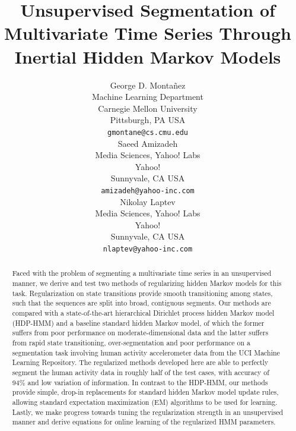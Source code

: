\documentclass[12pt]{article}
\begin{document}
\title{Unsupervised Segmentation of Multivariate Time Series Through Inertial Hidden Markov Models}

\author{
George D. Monta\~nez \\
Machine Learning Department\\
Carnegie Mellon University\\
Pittsburgh, PA USA\\
\texttt{gmontane@cs.cmu.edu} \\
\And    
Saeed Amizadeh\\
Media Sciences, Yahoo! Labs\\
Yahoo!\\
Sunnyvale, CA USA\\
\texttt{amizadeh@yahoo-inc.com} \\
\And
Nikolay Laptev \\
Media Sciences, Yahoo! Labs\\
Yahoo!\\
Sunnyvale, CA USA\\
\texttt{nlaptev@yahoo-inc.com} \\
}

\maketitle

\begin{abstract}
    Faced with the problem of segmenting a multivariate time series in an unsupervised manner, we derive and test two methods of regularizing hidden Markov models for this task. Regularization on state transitions provide smooth transitioning among states, such that the sequences are split into broad, contiguous segments. Our methods are compared with a state-of-the-art hierarchical Dirichlet process hidden Markov model (HDP-HMM) and a baseline standard hidden Markov model, of which the former suffers from poor performance on moderate-dimensional data and the latter suffers from rapid state transitioning, over-segmentation and poor performance on a segmentation task involving human activity accelerometer data from the UCI Machine Learning Repository. The regularized methods developed here are able to perfectly segment the human activity data in roughly half of the test cases, with accuracy of 94\% and low variation of information. In contrast to the HDP-HMM, our methods provide simple, drop-in replacements for standard hidden Markov model update rules, allowing standard expectation maximization (EM) algorithms to be used for learning. Lastly, we make progress towards tuning the regularization strength in an unsupervised manner and derive equations for online learning of the regularized HMM parameters.
\end{abstract}
\end{document}
